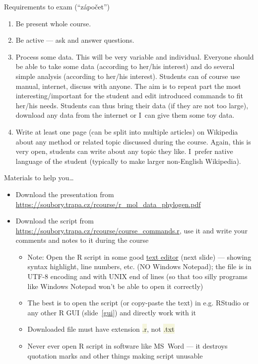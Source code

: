 \documentclass[compress, xelatex, 11pt, xcolor=svgnames, aspectratio=169,
	hyperref={
		bookmarks=true,
		unicode=true,
		colorlinks=true,
		pdftitle={Molecular data in R},
		plainpages=false,
		pdfauthor={Vojtech Zeisek},
		pdfsubject={Course about phylogeny and evolution in R},
		pdfcreator={XeLaTeX},
		pdfkeywords={R, evolution, phylogeny, molecular data},
		linkcolor=Crimson, %
		anchorcolor=Magenta, %
		citecolor=Magenta, %
		filecolor=Magenta, %
		menucolor=Magenta, %
		urlcolor=DodgerBlue, %
		},
	url={hyphens, lowtilde} %
	]{beamer}
\renewcommand{\texttt}[1]{\colorbox{Beige}{{\ttfamily #1}}}
\begin{document}
\begin{frame}{Requirements to exam (\enquote{zápočet})}
	\begin{enumerate}
		\item Be present whole course.
		\item Be active --- ask and answer questions.
		\item Process some data. This will be very variable and individual. Everyone should be able to take some data (according to her/his interest) and do several simple analysis (according to her/his interest). Students can of course use manual, internet, discuss with anyone. The aim is to repeat part the most interesting/important for the student and edit introduced commands to fit her/his needs. Students can thus bring their data (if they are not too large), download any data from the internet or I~can give them some toy data.
		\item Write at least one page (can be split into multiple articles) on Wikipedia about any method or related topic discussed during the course. Again, this is very open, students can write about any topic they like. I~prefer native language of the student (typically to make larger non-English Wikipedia).
	\end{enumerate}
\end{frame}

\begin{frame}{Materials to help you\ldots}
	\begin{itemize}
		\item Download the presentation from \url{https://soubory.trapa.cz/rcourse/r_mol_data_phylogen.pdf}
		\item Download the script from \url{https://soubory.trapa.cz/rcourse/course_commands.r}, use it and write your comments and notes to it during the course
		\begin{itemize}
			\item \alert{Note:} Open the R script in some \alert{good} \href{https://texteditors.org/cgi-bin/wiki.pl?PickingATextEditor}{text editor} (next slide) --- showing syntax highlight, line numbers, etc. (\alert{NO} Windows Notepad); the file is in UTF-8 encoding and with UNIX end of lines (so that too silly programs like Windows Notepad won't be able to open it correctly)
			\item The best is to open the script (or copy-paste the text) in e.g. RStudio or any other R GUI (slide~\ref{gui}) and directly work with it
			\item \alert{Downloaded file must have extension \texttt{*.r}, not \texttt{*.txt}}
			\item \alert{Never ever} open R script in software like MS~Word --- it destroys quotation marks and other things making script unusable
		\end{itemize}
	\end{itemize}
\end{frame}
\end{document}
